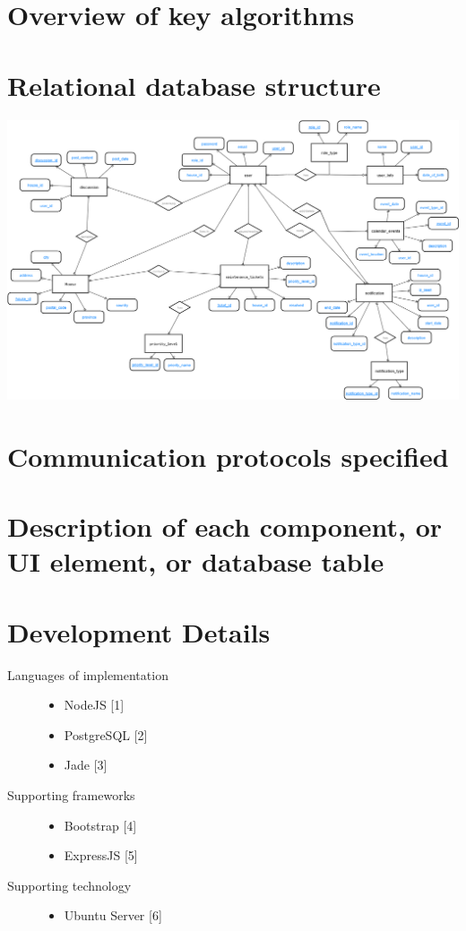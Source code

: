 \documentclass[12pt]{article}
\begin{document}
%
\section{Overview of key algorithms}

\clearpage
%
\section{Relational database structure}
\includegraphics[scale=0.397, angle=-90, keepaspectratio]{images/ER_Diagram.png}
%
\section{Communication protocols specified}

%
\section{Description of each component, or UI element, or database table}

%
\section{Development Details}
\begin{description}
  \item[Languages of implementation] \hfill
    \begin{itemize}
      \item NodeJS [1]
      \item PostgreSQL [2]
      \item Jade [3]
    \end{itemize}
  \item[Supporting frameworks] \hfill
    \begin{itemize}
      \item Bootstrap [4]
      \item ExpressJS [5]
    \end{itemize}
  \item[Supporting technology] \hfill
    \begin{itemize}
      \item Ubuntu Server [6]
    \end{itemize}
\end{description}
\end{document}
